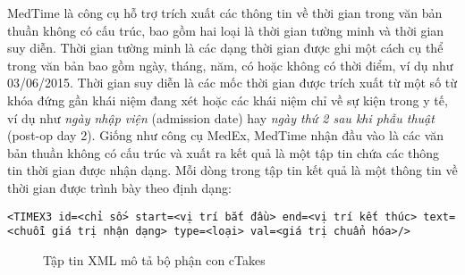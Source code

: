 MedTime là công cụ hỗ trợ trích xuất các thông tin về thời gian trong văn bản thuần không có cấu trúc, bao gồm hai loại là thời gian tường minh và thời gian suy diễn. Thời gian tường minh là các dạng thời gian được ghi một cách cụ thể trong văn bản bao gồm ngày, tháng, năm, có hoặc không có thời điểm, ví dụ như 03/06/2015. Thời gian suy diễn là các mốc thời gian được trích xuất từ một số từ khóa đứng gần khái niệm đang xét hoặc các khái niệm chỉ về sự kiện trong y tế, ví dụ như \emph{ngày nhập viện} (admission date) hay \emph{ngày thứ 2 sau khi phẫu thuật} (post-op day 2). Giống như công cụ MedEx, MedTime nhận đầu vào là các văn bản thuần không có cấu trúc và xuất ra kết quả là một tập tin chứa các thông tin thời gian được nhận dạng. Mỗi dòng trong tập tin kết quả là một thông tin về thời gian được trình bày theo định dạng:

\begin{center}
\texttt{<TIMEX3 id=<chỉ số> start=<vị trí bắt đầu> end=<vị trí kết thúc> text=<chuỗi giá trị nhận dạng> type=<loại> val=<giá trị chuẩn hóa>/>}\\
\end{center}

\begin{figure}[ht]
\centering
{}

\caption{Tập tin XML mô tả bộ phận con cTakes\label{ctakesdesc}}
\end{figure}
